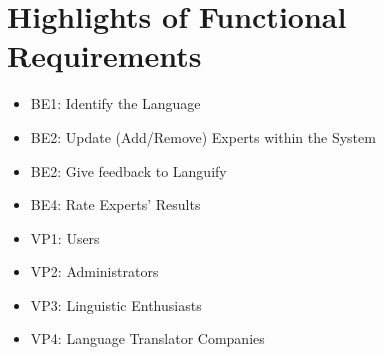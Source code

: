\section{Highlights of Functional Requirements}
\label{sec:functional_requirements}


\begin{itemize}
	\item BE1: Identify the Language
	\item BE2: Update (Add/Remove) Experts within the System
	\item BE2: Give feedback to Languify
	\item BE4: Rate Experts' Results
\end{itemize}

\begin{itemize}
	\item VP1: Users
	\item VP2: Administrators
	\item VP3: Linguistic Enthusiasts
	\item VP4: Language Translator Companies
\end{itemize}



\begin{enumerate}[{\bf BE1:}]


	
	

	






	
\end{enumerate}